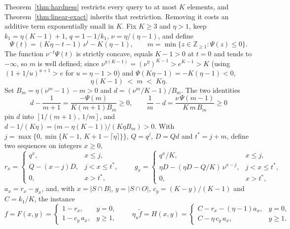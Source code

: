 Theorem~\ref{thm:hardness} restricts every query to at most $K$ elements,
and Theorem~\ref{thm:linear-exact} inherits that restriction.  Removing it
costs an additive term exponentially small in $K$.  Fix $K\ge3$ and
$\eta>1$, keep $k_1=\eta(K-1)+1$, $q=1-1/k_1$, $\nu=\eta/(\eta-1)$, and
define
\[
  \Psi(t)=(K\eta-t-1)\,\nu^{t}-K(\eta-1),
  \qquad
  m=\min\{z\in\mathbb Z_{\ge1}:\Psi(z)\le0\}.
\]
The function $\nu^{-t}\Psi(t)$ is strictly concave, equals $K-1>0$ at
$t=0$ and tends to $-\infty$, so $m$ is well defined; since
$\nu^{\eta(K-1)}=(\nu^{\eta})^{K-1}>e^{K-1}>K$ (using
$(1+1/u)^{u+1}>e$ for $u=\eta-1>0$) and $\Psi(K\eta-1)=-K(\eta-1)<0$,
\[
  \eta(K-1)\;<\;m\;<\;K\eta.
\]
Set $B_m=\eta(\nu^{m}-1)-m>0$ and $d=(\nu^{m}/K-1)/B_m$.  The two
identities
\[
  d-\frac{1}{m+1}=\frac{-\Psi(m)}{K(m+1)B_m}\ge0,
  \qquad
  \frac1m-d=\frac{\nu\,\Psi(m-1)}{K\,m\,B_m}\ge0
\]
pin $d$ into $[1/(m+1),\,1/m]$, and
$d-1/(K\eta)=\bigl(m-\eta(K-1)\bigr)/(K\eta B_m)>0$.  With
$j=\max\{0,\min\{K-1,\,K+1-\lceil\eta\rceil\}\}$, $Q=q^{j}$, $D=Qd$ and
$t^{\ast}=j+m$, define two sequences on integers $x\ge0$,
\[
  r_x=\begin{cases}q^{x},&x\le j,\\ Q-(x-j)D,&j<x\le t^{\ast},\\
    0,&x>t^{\ast},\end{cases}
  \qquad
  g_x=\begin{cases}q^{x}/K,&x\le j,\\
    \eta D-(\eta D-Q/K)\,\nu^{x-j},&j<x\le t^{\ast},\\
    0,&x>t^{\ast},\end{cases}
\]
$a_x=r_x-g_x$, and, with $x=|S\cap B|$, $y=|S\cap O|$,
$c_y=(K-y)/(K-1)$ and $C=k_1/K$, the instance
\[
  f=F(x,y)=\begin{cases}1-r_x,&y=0,\\1-c_y\,a_x,&y\ge1,\end{cases}
  \qquad
  \eta_u\tilde f=H(x,y)=\begin{cases}C-r_x-(\eta-1)a_x,&y=0,\\
    C-\eta\,c_y\,a_x,&y\ge1.\end{cases}
\]

